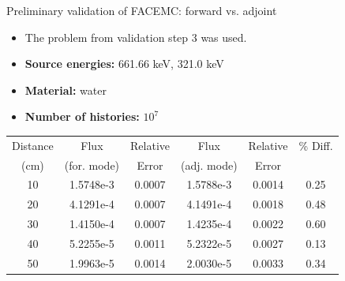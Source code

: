 \documentclass{beamer}
\begin{document}
\begin{frame}{Preliminary validation of FACEMC: forward vs. adjoint}

    \begin{itemize}
      \item The problem from validation step 3 was used.
      \item \textbf{Source energies:} 661.66 keV, 321.0 keV
      \item \textbf{Material:} water
      \item \textbf{Number of histories:} $10^7$
    \end{itemize}

    \begin{table}[ht]
      \centering
      \begin{tabular}{c c c c c c}
        \hline\hline
        Distance & Flux & Relative & Flux & Relative & \% Diff. \\ 
        (cm) & (for. mode) & Error & (adj. mode) & Error &  \\ [0.5ex]
        \hline
        10 & 1.5748e-3 & 0.0007 & 1.5788e-3 & 0.0014 & 0.25 \\
        20 & 4.1291e-4 & 0.0007 & 4.1491e-4 & 0.0018 & 0.48 \\
        30 & 1.4150e-4 & 0.0007 & 1.4235e-4 & 0.0022 & 0.60 \\
        40 & 5.2255e-5 & 0.0011 & 5.2322e-5 & 0.0027 & 0.13 \\
        50 & 1.9963e-5 & 0.0014 & 2.0030e-5 & 0.0033 & 0.34 \\ [1ex]
        \hline
      \end{tabular}
      \label{table:val_plan_s3_c0_flux_water}
    \end{table}   

\end{frame}
\end{document}
